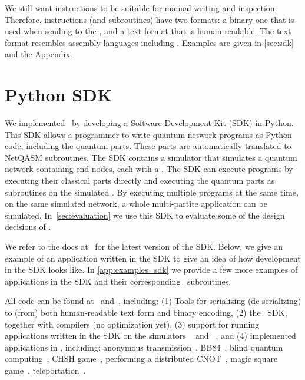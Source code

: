We still want \netqasm instructions to be suitable for manual writing and inspection.
Therefore, instructions (and subroutines) have two formats: a binary one that is used when sending to the \QNPU, and a text format that is human-readable.
The text format resembles assembly languages including \openqasm.
Examples are given in \cref{sec:sdk} and the Appendix.


\section{Python SDK}
\label{sec:python-sdk}
We implemented \netqasm\ by developing a Software Development Kit (SDK) in Python.
This SDK allows a programmer to write quantum network programs as Python code, including the quantum parts.
These parts are automatically translated to NetQASM subroutines.
The SDK contains a simulator that simulates a quantum network containing end-nodes, each with a \QNPU.
The SDK can execute programs by executing their classical parts directly and executing the quantum parts as \netqasm subroutines on the simulated \QNPU.
By executing multiple programs at the same time, on the same simulated network, a whole multi-partite application can be simulated.
In~\cref{sec:evaluation} we use this SDK to evaluate some of the design decisions of \netqasm.

We refer to the docs at~\cite{git_netqasm} for the latest version of the SDK.
Below, we give an example of an application written in the SDK to give an idea of how development in the SDK looks like.
In \cref{app:examples_sdk} we provide a few more examples of applications in the SDK and their corresponding \netqasm\ subroutines.

All code can be found at~\cite{git_netqasm} and~\cite{git_squidasm}, including:
    (1) Tools for serializing (de-serializing) to (from) both human-readable text form and binary encoding,
    (2) the \netqasm\ SDK, together with compilers (no optimization yet),
    (3) support for running applications written in the SDK on the simulators \netsquid~\cite{netsquid,coopmans2021netsquid} and \simulaqron~\cite{dahlberg2018simulaqron}, and
    (4) implemented applications in \netqasm, including: anonymous transmission~\cite{Christandl2005anonymous}, BB84~\cite{bb84}, blind quantum computing~\cite{broadbent2009universal,fitzsimons2017unconditionally}, CHSH game~\cite{Kaniewski2016}, performing a distributed CNOT~\cite{denchev2008distributed}, magic square game~\cite{brassard1999magicsquare}, teleportation~\cite{bennett1993teleporting}.

